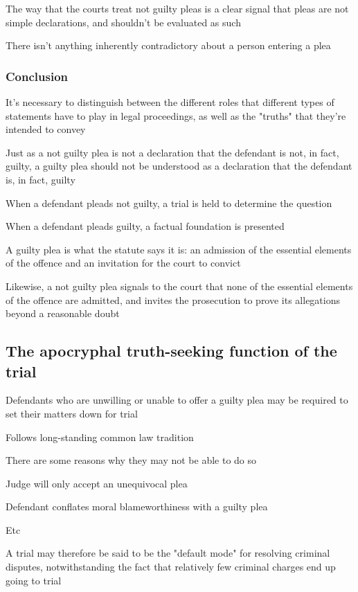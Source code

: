 The way that the courts treat not guilty pleas is a clear signal that pleas are not simple declarations, and shouldn't be evaluated as such

There isn't anything inherently contradictory about a person entering a plea

\subsubsection{Conclusion}

It's necessary to distinguish between the different roles that different types of statements have to play in legal proceedings, as well as the "truths" that they're intended to convey

Just as a not guilty plea is not a declaration that the defendant is not, in fact, guilty, a guilty plea should not be understood as a declaration that the defendant is, in fact, guilty

When a defendant pleads not guilty, a trial is held to determine the question

When a defendant pleads guilty, a factual foundation is presented

A guilty plea is what the statute says it is: an admission of the essential elements of the offence and an invitation for the court to convict

Likewise, a not guilty plea signals to the court that none of the essential elements of the offence are admitted, and invites the prosecution to prove its allegations beyond a reasonable doubt

\subsection{The apocryphal truth-seeking function of the trial}

Defendants who are unwilling or unable to offer a guilty plea may be required to set their matters down for trial

Follows long-standing common law tradition

There are some reasons why they may not be able to do so

Judge will only accept an unequivocal plea

Defendant conflates moral blameworthiness with a guilty plea

Etc

A trial may therefore be said to be the "default mode" for resolving criminal disputes, notwithstanding the fact that relatively few criminal charges end up going to trial

